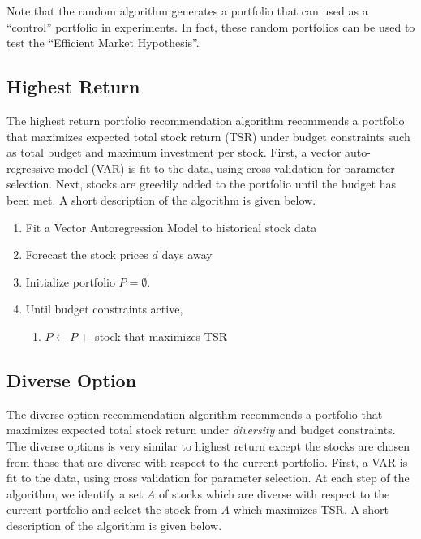 \documentclass{article}
\begin{document}

Note that the random algorithm generates a portfolio that can used as a ``control'' portfolio in experiments. In fact, these random portfolios can be used to test the ``Efficient Market Hypothesis''.

\subsection{Highest Return}
The highest return portfolio recommendation algorithm recommends a portfolio that maximizes expected total stock return (TSR) under budget constraints such as total budget and maximum investment per stock. First, a vector auto-regressive model (VAR) is fit to the data, using cross validation for parameter selection. Next, stocks are greedily added to the portfolio until the budget has been met. A short description of the algorithm is given below.

\begin{enumerate}
	\item Fit a Vector Autoregression Model to historical stock data
	\item Forecast the stock prices $d$ days away
	\item Initialize portfolio $P = \emptyset$. 
	\item Until budget constraints active,
		\begin{enumerate}
			\item $P \leftarrow P +$ stock that maximizes TSR
		\end{enumerate}
\end{enumerate}

\subsection{Diverse Option}
The diverse option recommendation algorithm recommends a portfolio that maximizes expected total stock return under \emph{diversity} and budget constraints. The diverse options is very similar to highest return except the stocks are chosen from those that are diverse with respect to the current portfolio. First, a VAR is fit to the data, using cross validation for parameter selection. At each step of the algorithm, we identify a set $A$ of stocks which are diverse with respect to the current portfolio and select the stock from $A$ which maximizes TSR. A short description of the algorithm is given below.
\end{document}

